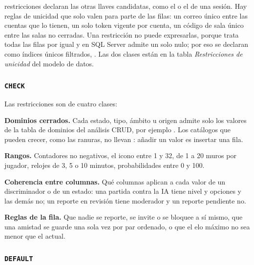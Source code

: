 \bdNumUnicas{} restricciones  declaran las otras llaves candidatas, como el  o el  de una sesión. Hay reglas de unicidad que solo valen para parte de las filas: un correo único entre las cuentas que lo tienen, un solo token vigente por cuenta, un código de sala único entre las salas no cerradas. Una restricción  no puede expresarlas, porque trata todas las filas por igual y en SQL Server admite un solo nulo; por eso se declaran como \bdNumIndicesUnicos{} índices únicos filtrados, . Las dos clases están en la tabla \textit{Restricciones de unicidad} del modelo de datos.

\subsubsection*{\texttt{CHECK}}

Las \bdNumChecks{} restricciones  son de cuatro clases:

\begin{reglas}
  \item \textbf{Dominios cerrados.} Cada estado, tipo, ámbito u origen admite solo los valores de la tabla de dominios del análisis CRUD, por ejemplo . Los catálogos que pueden crecer, como las ranuras, no llevan : añadir un valor es insertar una fila.
  \item \textbf{Rangos.} Contadores no negativos, el icono entre 1 y 32, de 1 a 20 muros por jugador, relojes de 3, 5 o 10 minutos, probabilidades entre 0 y 100.
  \item \textbf{Coherencia entre columnas.} Qué columnas aplican a cada valor de un discriminador o de un estado: una partida contra la IA tiene nivel y opciones y las demás no; un reporte en revisión tiene moderador y un reporte pendiente no.
  \item \textbf{Reglas de la fila.} Que nadie se reporte, se invite o se bloquee a sí mismo, que una amistad se guarde una sola vez por par ordenado, o que el elo máximo no sea menor que el actual.
\end{reglas}



\subsubsection*{\texttt{DEFAULT}}

